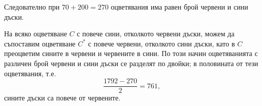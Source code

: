 Следователно при $70+200=270$ оцветявания има равен брой червени и сини дъски.

На всяко оцветяване $C$ с повече сини, отколкото червени дъски, можем да съпоставим оцветяване $C^*$ с повече червени, отколкото сини дъски, като в $C$ преоцветим сините в червени и червените в сини. По този начин оцветяванията с различен брой червени и сини дъски се разделят по двойки; в половината от тези оцветявания, т.е.
$$
\frac{1792-270}{2}=761,
$$
сините дъски са повече от червените.
